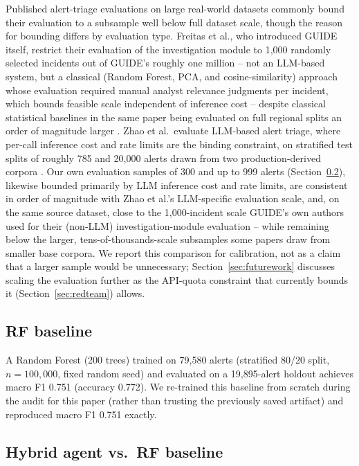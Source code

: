 \documentclass[conference]{IEEEtran}
\begin{document}
Published alert-triage evaluations on large real-world datasets commonly bound their evaluation to
a subsample well below full dataset scale, though the reason for bounding differs by evaluation
type. Freitas et al., who introduced GUIDE itself, restrict their evaluation of the investigation
module to 1{,}000 randomly selected incidents out of GUIDE's roughly one million -- not an
LLM-based system, but a classical (Random Forest, PCA, and cosine-similarity) approach whose
evaluation required manual analyst relevance judgments per incident, which bounds feasible scale
independent of inference cost -- despite classical statistical baselines in the same paper being
evaluated on full regional splits an order of magnitude larger \cite{freitas2024guide}. Zhao et
al.\ evaluate LLM-based alert triage, where per-call inference cost and rate limits are the binding
constraint, on stratified test splits of roughly 785 and 20{,}000 alerts drawn from two
production-derived corpora \cite{zhao2025infodense}. Our own evaluation samples of 300 and up to
999 alerts (Section~\ref{sec:hybrideval}), likewise bounded primarily by LLM inference cost and
rate limits, are consistent in order of magnitude with Zhao et al.'s LLM-specific evaluation scale,
and, on the same source dataset, close to the 1{,}000-incident scale GUIDE's own authors used for
their (non-LLM) investigation-module evaluation -- while remaining below the larger,
tens-of-thousands-scale subsamples some papers draw from smaller base corpora. We report this
comparison for calibration, not as a claim that a
larger sample would be unnecessary; Section~\ref{sec:futurework} discusses scaling the evaluation
further as the API-quota constraint that currently bounds it (Section~\ref{sec:redteam}) allows.

\subsection{RF baseline}

A Random Forest (200 trees) trained on 79{,}580 alerts (stratified 80/20 split, $n=100{,}000$,
fixed random seed) and evaluated on a 19{,}895-alert holdout achieves macro F1 0.751 (accuracy
0.772). We re-trained this baseline from scratch during the audit for this paper (rather than
trusting the previously saved artifact) and reproduced macro F1 0.751 exactly.

\subsection{Hybrid agent vs.\ RF baseline}
\label{sec:hybrideval}
\end{document}
